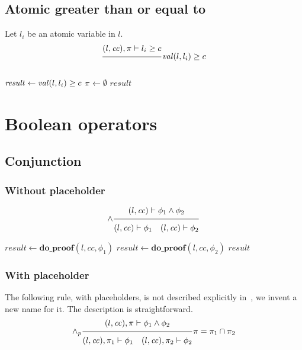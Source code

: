 \documentclass{article}
\newcommand{\proofrule}[3][]{#1 \frac{\raisebox{.7ex}{\normalsize{$#2$}}}
  {\raisebox{-1.0ex}{\normalsize{$#3$}}}}
\newcommand{\placeholder}[1][]{\pi_{#1}}
\newcommand{\loc}{l}
\newcommand{\region}{\mathit{cc}}
\newcommand{\var}[1]{\ensuremath{\mathit{#1}}}
\newcommand{\method}[1]{\ensuremath{\mathbf{#1}}}
\begin{document}
\subsection{Atomic greater than or equal to}
Let $\loc_i$ be an atomic variable in $\loc$. 
\[
  \proofrule
  {(\loc, \region), \placeholder \vdash \loc_i \geq c}
  {}
  \val(\loc, \loc_i) \geq c 
\]

\begin{algorithm}[H]
  \caption{$\method{do\_proof\_place\_atomic\_ge}(\loc, \region, \placeholder, \loc_i \geq c)$}
  \begin{algorithmic}
  \STATE $\var{result} \gets \val(\loc, \loc_i) \geq c$
  \IF{$\lnot \var{result}$}
    \STATE $\placeholder \gets \emptyset$
  \ENDIF
  \RETURN $\var{result}$
\end{algorithmic}
\end{algorithm}

\section{Boolean operators}

\subsection{Conjunction}

\subsubsection{Without placeholder}
\[
\proofrule[\land]
{(\loc, \region) \vdash \phi_1 \land \phi_2}
{(\loc, \region) \vdash \phi_1
\quad (\loc, \region) \vdash \phi_2}
\]

\begin{algorithm}[H]
\caption{$\method{do\_proof\_and}(\loc, \region, \phi_1 \land \phi_2)$}
\begin{algorithmic}
\STATE $\var{result} \gets \method{do\_proof}(\loc, \region, \phi_1)$
\IF{$\var{result}$}
  \STATE $\var{result} \gets \method{do\_proof}(\loc, \region, \phi_2)$
\ENDIF
\RETURN \var{result}
\end{algorithmic}
\end{algorithm}

\subsubsection{With placeholder}
The following rule, with placeholders, is not described explicitly in~\cite{FC:14,FC:14report}, we invent a new name for it. The description is straightforward.
\[
\proofrule[\land_p]
{(\loc, \region), \placeholder \vdash \phi_1 \land \phi_2}
{(\loc, \region), \placeholder[1] \vdash \phi_1
\quad (\loc, \region), \placeholder[2] \vdash \phi_2}
\placeholder = \placeholder[1] \cap \placeholder[2]
\]
\end{document}
